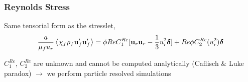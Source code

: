 \documentclass{sintefbeamer}
\begin{document}
\begin{frame}
  \frametitle{Reynolds Stress}

Same tensorial form as the stresslet,
  \begin{align*}
    \frac{a}{\mu_f u_r} \left<\chi_f\rho_f\textbf{u}_f'\textbf{u}_f'\right>
     =
    \phi Re C_1^{Re}
    [
      \textbf{u}_r\textbf{u}_r - \frac{1}{3}u_r ^2\bm\delta 
      ]
      + Re \phi C_2^{Re} (u_r ^2) \bm\delta
  \end{align*} 

  $C_1^{Re}$, $C_2^{Re}$ are unknown and cannot be computed analytically (Caflisch \& Luke paradox) $\rightarrow$ we perform particle resolved simulations 
\end{frame}
\end{document}

